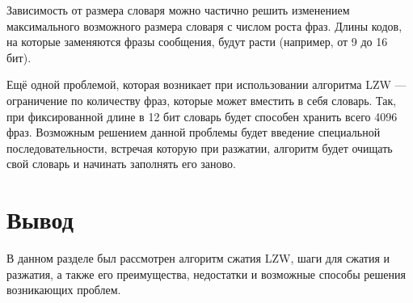 Зависимость от размера словаря можно частично решить изменением максимального возможного размера словаря с числом роста фраз. Длины кодов, на которые заменяются фразы сообщения, будут расти (например, от 9 до 16 бит).  

Ещё одной проблемой, которая возникает при использовании алгоритма LZW --- ограничение по количеству фраз, которые может вместить в себя словарь. Так, при фиксированной длине в 12 бит словарь будет способен хранить всего 4096 фраз. Возможным решением данной проблемы будет введение специальной последовательности, встречая которую при разжатии, алгоритм будет очищать свой словарь и начинать заполнять его заново.

\section*{Вывод}

В данном разделе был рассмотрен алгоритм сжатия LZW, шаги для сжатия и разжатия, а также его преимущества, недостатки и возможные способы решения возникающих проблем.